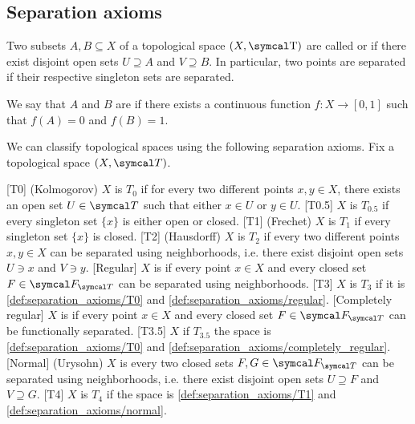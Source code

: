\subsection{Separation axioms}\label{subsec:separation_axioms}

\begin{definition}\label{def:topological_space_separation}
  Two subsets \( A, B \subseteq X \) of a topological space \( (X, \CT) \) are called  or  if there exist disjoint open sets \( U \supseteq A \) and \( V \supseteq B \). In particular, two points are separated if their respective singleton sets are separated.

  We say that \( A \) and \( B \) are  if there exists a continuous function \( f: X \to [0, 1] \) such that \( f(A) = 0 \) and \( f(B) = 1 \).
\end{definition}

\begin{definition}\label{def:separation_axioms}
  We can classify topological spaces using the following separation axioms. Fix a topological space \( (X, \Cal{T}) \).

  \begin{description}
    [T0] (Kolmogorov) \( X \) is \( T_0 \) if for every two different points \( x, y \in X \), there exists an open set \( U \in \Cal{T} \) such that either \( x \in U \) or \( y \in U \).
    [T0.5] \( X \) is \( T_{0.5} \) if every singleton set \( \{ x \} \) is either open or closed.
    [T1] (Frechet) \( X \) is \( T_1 \) if every singleton set \( \{ x \} \) is closed.
    [T2] (Hausdorff) \( X \) is \( T_2 \) if every two different points \( x, y \in X \) can be separated using neighborhoods, i.e. there exist disjoint open sets \( U \ni x \) and \( V \ni y \).
    [Regular] \( X \) is  if every point \( x \in X \) and every closed set \( F \in \Cal{F}_{\Cal{T}} \) can be separated using neighborhoods.
    [T3] \( X \) is \( T_3 \) if it is \ref{def:separation_axioms/T0} and \ref{def:separation_axioms/regular}.
    [Completely regular] \( X \) is  if every point \( x \in X \) and every closed set \( F \in \Cal{F}_{\Cal{T}} \) can be functionally separated.
    [T3.5] \( X \) if \( T_{3.5} \) the space is \ref{def:separation_axioms/T0} and \ref{def:separation_axioms/completely_regular}.
    [Normal] (Urysohn) \( X \) is  every two closed sets \( F, G \in \Cal{F}_{\Cal{T}} \) can be separated using neighborhoods, i.e. there exist disjoint open sets \( U \supseteq F \) and \( V \supseteq G \).
    [T4] \( X \) is \( T_4 \) if the space is \ref{def:separation_axioms/T1} and \ref{def:separation_axioms/normal}.
  \end{description}
\end{definition}

